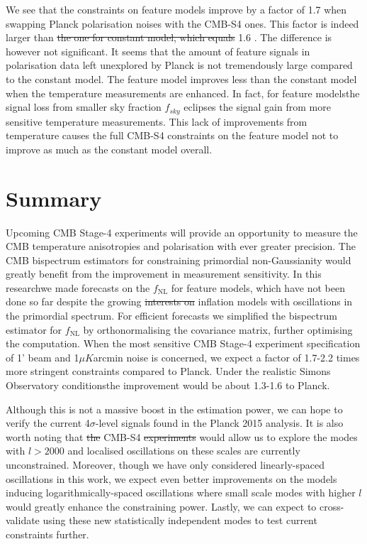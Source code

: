 \documentclass[a4paper,12pt,times,custombib,print,index]{Classes/PhDThesisPSnPDF} %
\providecommand{\DIFadd}[1]{{\protect\color{blue}\uwave{#1}}} %
\providecommand{\DIFdel}[1]{{\protect\color{red}\sout{#1}}}                      %
\providecommand{\DIFaddbegin}{} %
\providecommand{\DIFaddend}{} %
\providecommand{\DIFdelbegin}{} %
\providecommand{\DIFdelend}{} %
\newcommand{\DIFscaledelfig}{0.5}
\newlength{\DIFdelgraphicswidth} %
\newlength{\DIFdelgraphicsheight} %
\newcommand{\DIFaddincludegraphics}[2][]{{\color{blue}\fbox{\DIFOincludegraphics[#1]{#2}}}} %
\newcommand{\DIFdelincludegraphics}[2][]{%
\sbox{\DIFdelgraphicsbox}{\DIFOincludegraphics[#1]{#2}}%
\settoboxwidth{\DIFdelgraphicswidth}{\DIFdelgraphicsbox} %
\settoboxtotalheight{\DIFdelgraphicsheight}{\DIFdelgraphicsbox} %
\scalebox{\DIFscaledelfig}{%
\parbox[b]{\DIFdelgraphicswidth}{\usebox{\DIFdelgraphicsbox}\\[-\baselineskip] \rule{\DIFdelgraphicswidth}{0em}}\llap{\resizebox{\DIFdelgraphicswidth}{\DIFdelgraphicsheight}{%
\setlength{\unitlength}{\DIFdelgraphicswidth}%
\begin{picture}(1,1)%
\thicklines\linethickness{2pt} %
{\color[rgb]{1,0,0}\put(0,0){\framebox(1,1){}}}%
{\color[rgb]{1,0,0}\put(0,0){\line( 1,1){1}}}%
{\color[rgb]{1,0,0}\put(0,1){\line(1,-1){1}}}%
\end{picture}%
}\hspace*{3pt}}} %
} %
\DeclareRobustCommand{\DIFaddbegin}{\DIFOaddbegin \let\includegraphics\DIFaddincludegraphics} %
\DeclareRobustCommand{\DIFaddend}{\DIFOaddend \let\includegraphics\DIFOincludegraphics} %
\DeclareRobustCommand{\DIFdelbegin}{\DIFOdelbegin \let\includegraphics\DIFdelincludegraphics} %
\DeclareRobustCommand{\DIFdelend}{\DIFOaddend \let\includegraphics\DIFOincludegraphics} %
\begin{document}
We see that the constraints on feature models improve by a factor of 1.7 when swapping Planck polarisation noises with the CMB-S4 ones. This factor is indeed larger than \DIFdelbegin \DIFdel{the one for constant model, which equals }\DIFdelend 1.6 \DIFaddbegin \DIFadd{of the constant model}\DIFaddend . The difference is however not significant. It seems that the amount of feature signals in polarisation data left unexplored by Planck is not tremendously large compared to the constant model. The feature model improves less than the constant model when the temperature measurements are enhanced. In fact, for feature models\DIFaddbegin \DIFadd{, }\DIFaddend the signal loss from smaller sky fraction \DIFdelbegin \DIFdel{$f_{sky}$ }\DIFdelend \DIFaddbegin \DIFadd{$f_\text{sky}$ }\DIFaddend eclipses the signal gain from more sensitive temperature measurements. This lack of improvements from temperature causes the full CMB-S4 constraints on the feature model not to improve as much as the constant model overall.

\newpage
\section*{Summary} 

Upcoming CMB Stage-4 experiments will provide an opportunity to measure the CMB temperature anisotropies and polarisation with ever greater precision. The CMB bispectrum estimators for constraining primordial non-Gaussianity would greatly benefit from the improvement in measurement sensitivity. In this research\DIFaddbegin \DIFadd{, }\DIFaddend we made forecasts on the $f_\text{NL}$ for feature models, which have not been done so far despite the growing \DIFdelbegin \DIFdel{interests on }\DIFdelend \DIFaddbegin \DIFadd{interest in }\DIFaddend inflation models with oscillations in the primordial spectrum. For efficient forecasts we simplified the bispectrum estimator for $f_\text{NL}$ by orthonormalising the covariance matrix, further optimising the computation. When the most sensitive CMB Stage-4 experiment specification of 1' beam and 1$\mu K$arcmin noise is concerned, we expect a factor of 1.7-2.2 times more stringent constraints compared to Planck. Under the realistic Simons Observatory conditions\DIFaddbegin \DIFadd{, }\DIFaddend the improvement would be about 1.3-1.6 to Planck.

Although this is not a massive boost in the estimation power, we can hope to verify the current 4$\sigma$-level signals found in the Planck 2015 analysis. It is also worth noting that \DIFdelbegin \DIFdel{the }\DIFdelend CMB-S4 \DIFdelbegin \DIFdel{experiments }\DIFdelend would allow us to explore the modes with $l>2000$ and localised oscillations on these scales are currently unconstrained. Moreover, though we have only considered linearly-spaced oscillations in this work, we expect even better improvements on the models inducing logarithmically-spaced oscillations where small scale modes with higher $l$ would greatly enhance the constraining power. Lastly, we can expect to cross-validate using these new statistically independent modes to test current constraints further.
\end{document}
